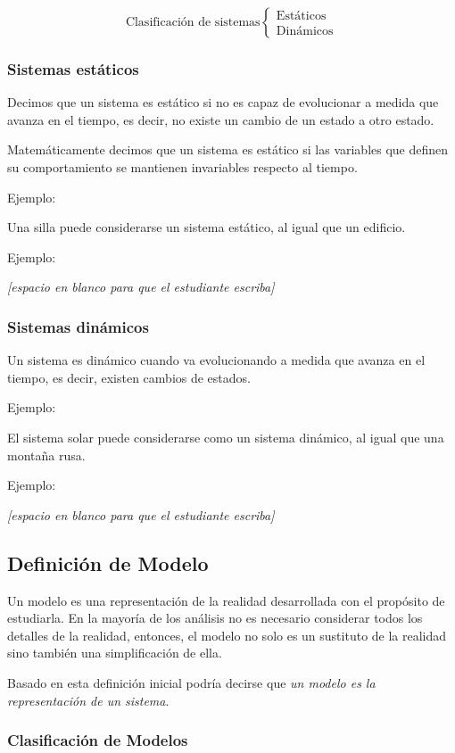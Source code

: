 \documentclass[11pt,letterpaper]{report}
\newcommand{\espacio}{\par\noindent\textit{[espacio en blanco para que el estudiante escriba]}\par}
\begin{document}
\[
\text{Clasificación de sistemas}
\begin{cases}
\text{Estáticos}\\
\text{Dinámicos}
\end{cases}
\]

\subsubsection*{Sistemas estáticos}

Decimos que un sistema es estático si no es capaz de evolucionar a medida que avanza en el tiempo, es decir, no existe un cambio de un estado a otro estado.

Matemáticamente decimos que un sistema es estático si las variables que definen su comportamiento se mantienen invariables respecto al tiempo.

Ejemplo:

Una silla puede considerarse un sistema estático, al igual que un edificio.

Ejemplo:
\espacio

\subsubsection*{Sistemas dinámicos}

Un sistema es dinámico cuando va evolucionando a medida que avanza en el tiempo, es decir, existen cambios de estados.

Ejemplo:

El sistema solar puede considerarse como un sistema dinámico, al igual que una montaña rusa.

Ejemplo:
\espacio

\subsection*{Definición de Modelo}

Un modelo es una representación de la realidad desarrollada con el propósito de estudiarla. En la mayoría de los análisis no es necesario considerar todos los detalles de la realidad, entonces, el modelo no solo es un sustituto de la realidad sino también una simplificación de ella.

Basado en esta definición inicial podría decirse que \emph{un modelo es la representación de un sistema}.

\subsubsection*{Clasificación de Modelos}
\end{document}
